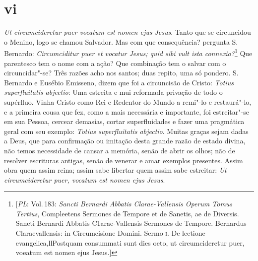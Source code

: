 \section*{vi}

\emph{Ut circumcideretur puer vocatum est nomen ejus Jesus}. Tanto que
se circuncidou o Menino, logo se chamou Salvador. Mas com que
consequência? pergunta S.\,Bernardo: \emph{Circumciditur puer et
vocatur Jesus; quid sibi vult ista connexio?}\footnote{[\textit{PL}: Vol.\,183: \textit{Sancti Bernardi Abbatis Clarae-Vallensis Operum Tomus Tertius}, Compleetens Sermones
de Tempore et de Sanetis, ae de Diversis. Saneti Bernardi Abbatis C1arae-Vallensis Sermones de
Tempore. Bernardus Claraevallensis: in Cireumcisione Domini. Sermo \textsc{i}. De leetione
evangeliea,llPostquam eonsummati sunt dies oeto, ut cireumcideretur puer, voeatum est nomen
ejus Jesus.]} Que parentesco tem o nome
com a ação? Que combinação tem o salvar com o circuncidar"-se? Três
razões acho nos santos; duas repito, uma só pondero. S.\,Bernardo e
Eusébio Emisseno, dizem que foi a circuncisão de Cristo: \emph{Totius
superfluitatis abjectio}: Uma estreita e mui reformada privação de todo
o supérfluo. Vinha Cristo como Rei e Redentor do Mundo a remi"-lo e
restaurá"-lo, e a primeira cousa que fez, como a mais necessária e
importante, foi estreitar"-se em sua Pessoa, cercear demasias, cortar
superfluidades e fazer uma pragmática geral com seu exemplo:
\emph{Totius superfluitatis abjectio}. Muitas graças sejam dadas a Deus,
que para confirmação ou imitação desta grande razão de estado divina,
não temos necessidade de cansar a memória, senão de abrir os olhos; não
de resolver escrituras antigas, senão de venerar e amar exemplos
presentes. Assim obra quem assim reina; assim sabe libertar quem assim
sabe estreitar: \emph{Ut circumcideretur puer, vocatum est nomen ejus
Jesus}.

